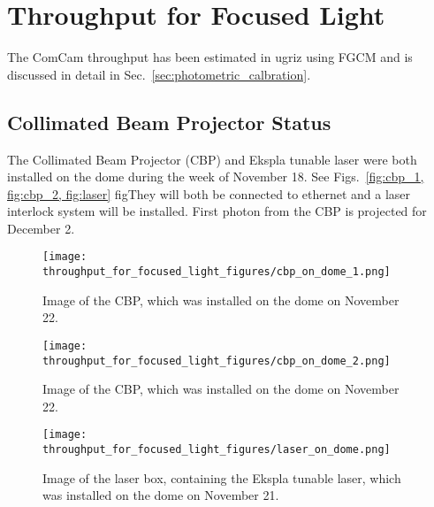 \section{Throughput for Focused Light}
\label{sec:throughout_for_focused_light}

The ComCam throughput has been estimated in ugriz using FGCM and is discussed in detail in Sec.~\ref{sec:photometric_calbration}.

\subsection{Collimated Beam Projector Status}

The Collimated Beam Projector (CBP) and Ekspla tunable laser were both installed on the dome during the week of November 18. See Figs.~\ref{fig:cbp_1, fig:cbp_2, fig:laser} figThey will both be connected to ethernet and a laser interlock system will be installed. First photon from the CBP is projected for December 2.

\begin{figure}[htbp]
  \texttt{[image: throughput\_for\_focused\_light\_figures/cbp\_on\_dome\_1.png]}
  \caption{Image of the CBP, which was installed on the dome on November 22.}
  \label{fig:cbp_1}
\end{figure}
  
\begin{figure}[htbp]
  \texttt{[image: throughput\_for\_focused\_light\_figures/cbp\_on\_dome\_2.png]}
  \caption{Image of the CBP, which was installed on the dome on November 22.}
  \label{fig:cbp_2}
\end{figure}
  
\begin{figure}[htbp]
  \texttt{[image: throughput\_for\_focused\_light\_figures/laser\_on\_dome.png]}
  \caption{Image of the laser box, containing the Ekspla tunable laser, which was installed on the dome on November 21.}
  \label{fig:laser}
\end{figure}